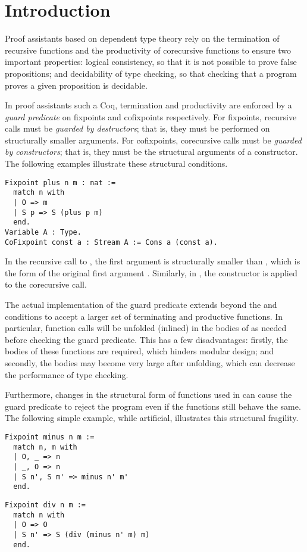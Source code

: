\section{Introduction}\label{sec:intro}

Proof assistants based on dependent type theory rely on the termination of recursive functions and the productivity of corecursive functions to ensure two important properties: logical consistency, so that it is not possible to prove false propositions; and decidability of type checking, so that checking that a program proves a given proposition is decidable.

In proof assistants such a Coq, termination and productivity are enforced by a \emph{guard predicate} on fixpoints and cofixpoints respectively.
For fixpoints, recursive calls must be \emph{guarded by destructors}; that is, they must be performed on structurally smaller arguments.
For cofixpoints, corecursive calls must be \emph{guarded by constructors}; that is, they must be the structural arguments of a constructor.
The following examples illustrate these structural conditions.

\begin{samepage}
\begin{verbatim}
Fixpoint plus n m : nat :=
  match n with
  | O => m
  | S p => S (plus p m)
  end.
Variable A : Type.
CoFixpoint const a : Stream A := Cons a (const a).
\end{verbatim}
\end{samepage}

In the recursive call to , the first argument  is structurally smaller than , which is the form of the original first argument . Similarly, in , the constructor  is applied to the corecursive call.

The actual implementation of the guard predicate extends beyond the \guardedbydestructors and \guardedbyconstructors conditions to accept a larger set of terminating and productive functions.
In particular, function calls will be unfolded (\ie inlined) in the bodies of \cofixpoints as needed before checking the guard predicate.
This has a few disadvantages: firstly, the bodies of these functions are required, which hinders modular design; and secondly, the \cofixpoint bodies may become very large after unfolding, which can decrease the performance of type checking.

Furthermore, changes in the structural form of functions used in \cofixpoints can cause the guard predicate to reject the program even if the functions still behave the same.
The following simple example, while artificial, illustrates this structural fragility.
\begin{verbatim}
Fixpoint minus n m :=
  match n, m with
  | O, _ => n
  | _, O => n
  | S n', S m' => minus n' m'
  end.
\end{verbatim}
\begin{verbatim}
Fixpoint div n m :=
  match n with
  | O => O
  | S n' => S (div (minus n' m) m)
  end.
\end{verbatim}

